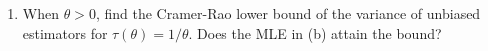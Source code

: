 \documentclass[titlepage]{article}
\begin{document}
\begin{enumerate}
\begin{enumerate}
  \item When $\theta > 0$, find the Cramer-Rao lower bound of the variance of unbiased estimators for $\tau(\theta) = 1/\theta$. Does the MLE in (b) attain the bound?
  \end{enumerate}
\end{enumerate}
\end{document}
